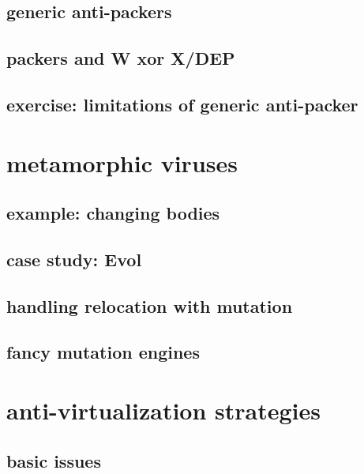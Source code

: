 \subsection{generic anti-packers}


\subsection{packers and W xor X/DEP}


\subsection{exercise: limitations of generic anti-packer}


\section{metamorphic viruses}


\subsection{example: changing bodies}


\subsection{case study: Evol}


\subsection{handling relocation with mutation}


\subsection{fancy mutation engines}


\section{anti-virtualization strategies}
\subsection{basic issues}


